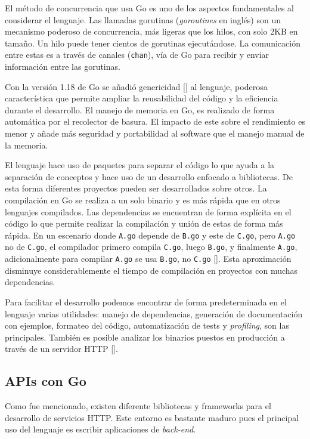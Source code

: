El método de concurrencia que usa Go es uno de los aspectos fundamentales al considerar el lenguaje. Las llamadas gorutinas (\textit{goroutines} en inglés) son un mecanismo poderoso de concurrencia, más ligeras que los hilos, con solo 2KB en tamaño. Un hilo puede tener cientos de gorutinas ejecutándose. La comunicación entre estas es a través de canales (\verb+chan+), vía de Go para recibir y enviar información entre las gorutinas.

Con la versión 1.18 de Go se añadió genericidad [\cite{go-generics}] al lenguaje, poderosa característica que permite ampliar la reusabilidad del código y la eficiencia durante el desarrollo. El manejo de memoria en Go, es realizado de forma automática por el recolector de basura. El impacto de este sobre el rendimiento es menor y añade más seguridad y portabilidad al software que el manejo manual de la memoria.

El lenguaje hace uso de paquetes para separar el código lo que ayuda a la separación de conceptos y hace uso de un desarrollo enfocado a bibliotecas. De esta forma diferentes proyectos pueden ser desarrollados sobre otros. La compilación en Go se realiza a un solo binario y es más rápida que en otros lenguajes compilados. Las dependencias se encuentran de forma explícita en el código lo que permite realizar la compilación y unión de estas de forma más rápida. En un escenario donde \verb+A.go+ depende de \verb+B.go+ y este de \verb+C.go+, pero \verb+A.go+ no de \verb+C.go+, el compilador primero compila \verb+C.go+, luego \verb+B.go+, y finalmente \verb+A.go+, adicionalmente para compilar \verb+A.go+ se usa \verb+B.go+, no \verb+C.go+ [\cite{go-deps}]. Esta aproximación disminuye considerablemente el tiempo de compilación en proyectos con muchas dependencias.

Para facilitar el desarrollo podemos encontrar de forma predeterminada en el lenguaje varias utilidades: manejo de dependencias, generación de documentación con ejemplos, formateo del código, automatización de tests y \textit{profiling}, son las principales. También es posible analizar los binarios puestos en producción a través de un servidor HTTP [\cite{go-pros-cons}].

\subsection{APIs con Go}

Como fue mencionado, existen diferente bibliotecas y frameworks para el desarrollo de servicios HTTP. Este entorno es bastante maduro pues el principal uso del lenguaje es escribir aplicaciones de \textit{back-end}.

